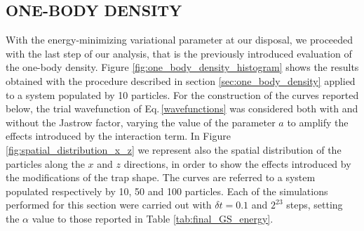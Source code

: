 \subsection{ONE-BODY DENSITY}
With the energy-minimizing variational parameter at our disposal, we proceeded with the last step of our analysis, that is the previously introduced evaluation of the one-body density. Figure \ref{fig:one_body_density_histogram} shows the results obtained with the procedure described in section \ref{sec:one_body_density} applied to a system populated by 10 particles. For the construction of the curves reported below, the trial wavefunction of Eq.\,\ref{wavefunctions} was considered both with and without the Jastrow factor, varying the value of the parameter $a$ to amplify the effects introduced by the interaction term. In Figure \ref{fig:spatial_distribution_x_z} we represent also the spatial distribution of the particles along the $x$ and $z$ directions, in order to show the effects introduced by the modifications of the trap shape. The curves are referred to a system populated respectively by 10, 50 and 100 particles. Each of the simulations performed for this section were carried out with $\delta t = 0.1$ and $2^{23}$ steps, setting the $\alpha$ value to those reported in Table \ref{tab:final_GS_energy}.

